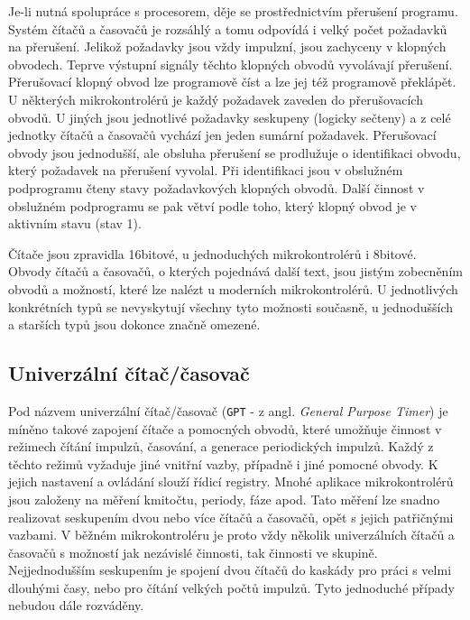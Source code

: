     Je-li nutná spolupráce s procesorem, děje se prostřednictvím přerušení programu. Systém čítačů 
    a časovačů je rozsáhlý a tomu odpovídá i velký počet požadavků na přerušení. Jelikož požadavky 
    jsou vždy impulzní, jsou zachyceny v klopných obvodech. Teprve výstupní signály těchto klopných 
    obvodů vyvolávají přerušení. Přerušovací klopný obvod lze programově číst a lze jej též 
    programově překlápět. U některých mikrokontrolérů je každý požadavek zaveden do přerušovacích 
    obvodů. U jiných jsou jednotlivé požadavky seskupeny (logicky sečteny) a z celé jednotky čítačů 
    a časovačů vychází jen jeden sumární požadavek. Přerušovací obvody jsou jednodušší, ale obsluha 
    přerušení se prodlužuje o identifikaci obvodu, který požadavek na přerušení vyvolal. Při 
    identifikaci jsou v obslužném podprogramu čteny stavy požadavkových klopných obvodů. Další 
    činnost v obslužném podprogramu se pak větví podle toho, který klopný obvod je v aktivním stavu 
    (stav 1).
    
    Čítače jsou zpravidla 16bitové, u jednoduchých mikrokontrolérů i 8bitové. Obvody čítačů a 
    časovačů, o kterých pojednává další text, jsou jistým zobecněním obvodů a možností, které lze 
    nalézt u moderních mikrokontrolérů. U jednotlivých konkrétních typů se nevyskytují všechny tyto 
    možnosti současně, u jednodušších a starších typů jsou dokonce značně omezené.
    
    \subsection{Univerzální čítač/časovač}
      Pod názvem univerzální čítač/časovač (\texttt{GPT} - z angl. \emph{General Purpose Timer}) je 
      míněno takové zapojení čítače a pomocných obvodů, které umožňuje činnost v režimech čítání 
      impulzů, časování, a generace periodických impulzů. Každý z těchto režimů vyžaduje jiné 
      vnitřní vazby, případně i jiné pomocné obvody. K jejich nastavení a ovládání slouží řídicí 
      registry. Mnohé aplikace mikrokontrolérů jsou založeny na měření kmitočtu, periody, fáze 
      apod. Tato měření lze snadno realizovat seskupením dvou nebo více čítačů a časovačů, opět s 
      jejich patřičnými vazbami. V běžném mikrokontroléru je proto vždy několik univerzálních 
      čítačů a časovačů s možností jak nezávislé činnosti, tak činnosti ve skupině. Nejjednodušším 
      seskupením je spojení dvou čítačů do kaskády pro práci s velmi dlouhými časy, nebo pro 
      čítání velkých počtů impulzů. Tyto jednoduché případy nebudou dále rozváděny.
      

